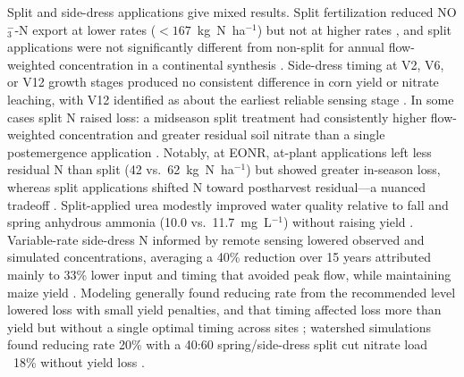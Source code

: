 Split and side-dress applications give mixed results. Split fertilization reduced NO$_3^-$-N export at lower rates ($<167$~kg~N~ha$^{-1}$) but not at higher rates \parencite{Liu2021}, and split applications were not significantly different from non-split for annual flow-weighted concentration in a continental synthesis \parencite{Hertzberger2019}. Side-dress timing at V2, V6, or V12 growth stages produced no consistent difference in corn yield or nitrate leaching, with V12 identified as about the earliest reliable sensing stage \parencite{Jaynes2013}. In some cases split N raised loss: a midseason split treatment had consistently higher flow-weighted concentration and greater residual soil nitrate than a single postemergence application \parencite{Jaynes2006}. Notably, at EONR, at-plant applications left less residual N than split (42 vs.\ 62~kg~N~ha$^{-1}$) but showed greater in-season loss, whereas split applications shifted N toward postharvest residual---a nuanced tradeoff \parencite{Bandura2025}. Split-applied urea modestly improved water quality relative to fall and spring anhydrous ammonia (10.0 vs.\ 11.7~mg~L$^{-1}$) without raising yield \parencite{Waring2022}. Variable-rate side-dress N informed by remote sensing lowered observed and simulated concentrations, averaging a 40\% reduction over 15 years attributed mainly to 33\% lower input and timing that avoided peak flow, while maintaining maize yield \parencite{Wilson2020b}. Modeling generally found reducing rate from the recommended level lowered loss with small yield penalties, and that timing affected loss more than yield but without a single optimal timing across sites \parencite{Jeong2018}; watershed simulations found reducing rate 20\% with a 40:60 spring/side-dress split cut nitrate load ~18\% without yield loss \parencite{Singh2023}.

